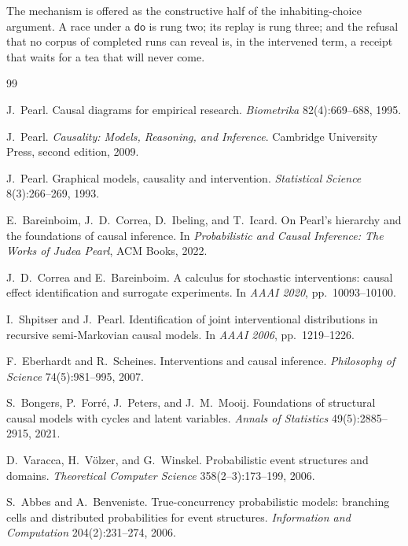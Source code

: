 \documentclass[11pt,a4paper]{article}
\theoremstyle{plain}
\theoremstyle{definition}
\theoremstyle{remark}
\newcommand{\dok}{\textsf{do}}
\begin{document}
The mechanism is offered as the constructive half of the inhabiting-choice
argument. A race under a $\dok$ is rung two; its replay is rung three; and the
refusal that no corpus of completed runs can reveal is, in the intervened
term, a receipt that waits for a tea that will never come.

\begin{thebibliography}{99}\raggedright

J.~Pearl.
\newblock Causal diagrams for empirical research.
\newblock \emph{Biometrika} 82(4):669--688, 1995.

J.~Pearl.
\newblock \emph{Causality: Models, Reasoning, and Inference}.
\newblock Cambridge University Press, second edition, 2009.

J.~Pearl.
\newblock Graphical models, causality and intervention.
\newblock \emph{Statistical Science} 8(3):266--269, 1993.

E.~Bareinboim, J.~D.~Correa, D.~Ibeling, and T.~Icard.
\newblock On Pearl's hierarchy and the foundations of causal inference.
\newblock In \emph{Probabilistic and Causal Inference: The Works of Judea
Pearl}, ACM Books, 2022.

J.~D.~Correa and E.~Bareinboim.
\newblock A calculus for stochastic interventions: causal effect identification
and surrogate experiments.
\newblock In \emph{AAAI 2020}, pp.~10093--10100.

I.~Shpitser and J.~Pearl.
\newblock Identification of joint interventional distributions in recursive
semi-Markovian causal models.
\newblock In \emph{AAAI 2006}, pp.~1219--1226.

F.~Eberhardt and R.~Scheines.
\newblock Interventions and causal inference.
\newblock \emph{Philosophy of Science} 74(5):981--995, 2007.

S.~Bongers, P.~Forr\'e, J.~Peters, and J.~M.~Mooij.
\newblock Foundations of structural causal models with cycles and latent
variables.
\newblock \emph{Annals of Statistics} 49(5):2885--2915, 2021.

D.~Varacca, H.~V\"olzer, and G.~Winskel.
\newblock Probabilistic event structures and domains.
\newblock \emph{Theoretical Computer Science} 358(2--3):173--199, 2006.

S.~Abbes and A.~Benveniste.
\newblock True-concurrency probabilistic models: branching cells and
distributed probabilities for event structures.
\newblock \emph{Information and Computation} 204(2):231--274, 2006.


\end{thebibliography}
\end{document}
